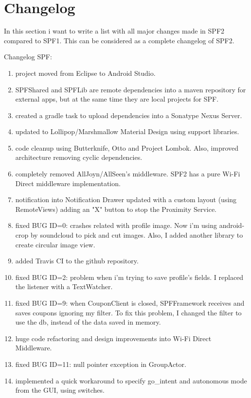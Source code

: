 \chapter{Changelog}
\label{changelog}

In this section i want to write a list with all major changes made in SPF2 compared to SPF1. This can be considered as a complete changelog of SPF2.

Changelog SPF:
\begin{enumerate}
	\item project moved from Eclipse to Android Studio.
	\item SPFShared and SPFLib are remote dependencies into a maven repository for external apps, but at the same time they are local projects for SPF.
	\item created a gradle task to upload dependencies into a Sonatype Nexus Server.
	\item updated to Lollipop/Marshmallow Material Design using support libraries.
	\item code cleanup using Butterknife, Otto and Project Lombok. Also, improved architecture removing cyclic dependencies.
	\item completely removed AllJoyn/AllSeen's middleware. SPF2 has a pure Wi-Fi Direct middleware implementation.
	\item notification into Notification Drawer updated with a custom layout (using RemoteViews) adding an "X" button to stop the Proximity Service.
	\item fixed BUG ID=0: crashes related with profile image. Now i'm using android-crop by soundcloud to pick and cut images. Also, I added another library to create circular image view.
	\item added Travis CI to the github repository.
	\item fixed BUG ID=2: problem when i'm trying to save profile's fields. I replaced the listener with a \textsf{TextWatcher}.
	\item fixed BUG ID=9: when CouponClient is closed, SPFFramework receives and saves coupons ignoring my filter. To fix this problem, I changed the filter to use the db, instead of the data saved in memory.
	\item huge code refactoring and design improvements into Wi-Fi Direct Middleware.
	\item fixed BUG ID=11: null pointer exception in GroupActor.
	\item implemented a quick workaround to specify go_intent and autonomous mode from the GUI, using switches.

\end{enumerate}
